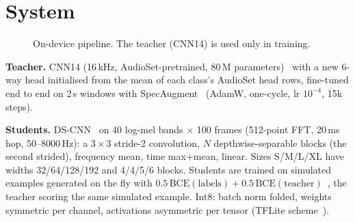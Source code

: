\documentclass[conference]{IEEEtran}
\begin{document}
\section{System}
\begin{figure}[t]\centering
{}
\caption{On-device pipeline. The teacher (CNN14) is used only in training.}\label{fig:sys}
\end{figure}

\textbf{Teacher.} CNN14 (16\,kHz, AudioSet-pretrained, 80\,M parameters)~\cite{panns} with a new
6-way head initialised from the mean of each class's AudioSet head rows, fine-tuned end to end
on 2\,s windows with SpecAugment~\cite{specaug} (AdamW, one-cycle, lr $10^{-4}$, 15k steps).

\textbf{Students.} DS-CNN~\cite{dscnn} on 40 log-mel bands $\times$ 100 frames (512-point FFT,
20\,ms hop, 50--8000\,Hz): a $3{\times}3$ stride-2 convolution, $N$ depthwise-separable blocks
(the second strided), frequency mean, time max+mean, linear. Sizes S/M/L/XL have widths
32/64/128/192 and 4/4/5/6 blocks. Students are trained on simulated examples generated on the fly
with $0.5\,\mathrm{BCE}(\text{labels}) + 0.5\,\mathrm{BCE}(\text{teacher})$~\cite{kd}, the
teacher scoring the same simulated example. Int8: batch norm folded, weights symmetric per
channel, activations asymmetric per tensor (TFLite scheme~\cite{tflm,jacob}).
\end{document}
